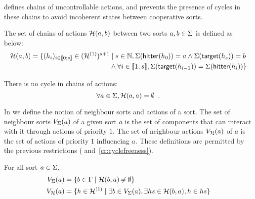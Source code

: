  defines chains of uncontrollable actions,
and  prevents the presence of cycles in these chains to avoid incoherent states between cooperative sorts.
\begin{definition}
\label{def:chainsactions}
  The set of chains of actions $\mathcal{H}(a, b)$ between two sorts $a, b \in \Sigma$ is defined as below:
  \begin{align*}
  \mathcal{H}(a, b) = \{ (h_i)_{i \in \llbracket 0; s \rrbracket} \in (\mathcal{H}^{(1)})^{s+1} &\mid s \in \mathbb{N}, \Sigma(\mathsf{hitter}(h_0)) = a \wedge \Sigma(\mathsf{target}(h_s)) = b \\
    & \wedge \forall i \in \llbracket 1; s \rrbracket, \Sigma(\mathsf{target}(h_{i-1})) = \Sigma(\mathsf{hitter}(h_{i})) \}
  \end{align*}
\end{definition}
\begin{criterion}
\label{cr:cyclefreeness}
  There is no cycle in chains of actions:
  $$\forall a \in \Sigma, \mathcal{H}(a, a) = \emptyset \enspace.$$
\end{criterion}

In  we define the notion of neighbour  sorts and actions of a sort.
The set of neighbour sorts $V_\Sigma(a)$ of a given sort $a$ is the set of components that can interact with it through actions of priority $1$.
The set of neighbour actions $V_{\mathcal{H}}(a)$ of $a$ is the set of actions of priority $1$ influencing $a$.
These definitions are permitted by the previous restrictions ( and~\ref{cr:cyclefreeness}).
\begin{definition}[$\Vs : \PHs \rightarrow \powerset(\PHsort)$ ; $\Vh : \PHs \rightarrow \powerset(\PHh)$]
\label{def:neighbours}
  For all sort $a \in \Sigma$,
  \begin{align*}
    V_\Sigma(a) &= \{ b \in \Gamma \mid \mathcal{H}(b, a) \not\nobreak\mkern -2mu = \emptyset \}\\
    V_{\mathcal{H}}(a) &= \{ h \in \mathcal{H}^{(1)} \mid \exists b \in V_\Sigma(a), \exists hs \in \mathcal{H}(b,a), h \in hs \}
  \end{align*}
\end{definition}

